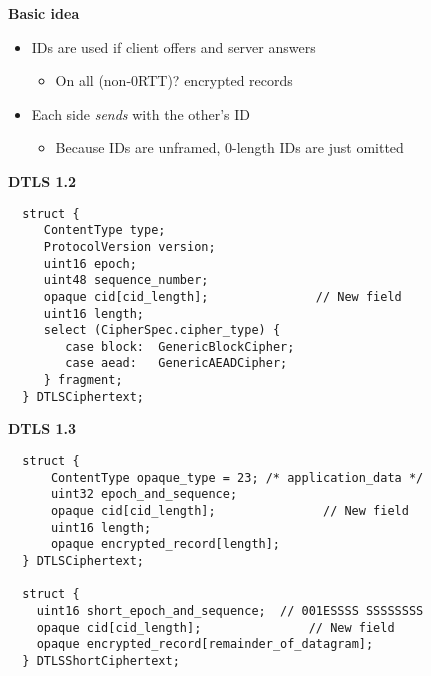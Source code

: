 \documentclass[helvetica]{seminar}
\newcommand{\heading}[1]{%
  \begin{center} 
    \large\bf 
    #1 
  \end{center} 
  \vspace{.4 in}}
\begin{document}
\begin{slide}
  \heading{Basic idea}
  
\begin{itemize}
\item IDs are used if client offers and server answers
  \begin{itemize}
    \item On all (non-0RTT)? encrypted records
  \end{itemize}
\item Each side \emph{sends} with the other's ID
  \begin{itemize}
    \item Because IDs are unframed, 0-length IDs are just omitted
  \end{itemize}
\end{itemize}
\end{slide}

\begin{slide}
  \heading{DTLS 1.2}

\begin{verbatim}
  struct {
     ContentType type;
     ProtocolVersion version;
     uint16 epoch;
     uint48 sequence_number;
     opaque cid[cid_length];               // New field
     uint16 length;
     select (CipherSpec.cipher_type) {
        case block:  GenericBlockCipher;
        case aead:   GenericAEADCipher;
     } fragment;
  } DTLSCiphertext;
\end{verbatim}
\end{slide}

\begin{slide}
  \heading{DTLS 1.3}

  \vspace{-5ex}
  \small{
\begin{verbatim}
  struct {
      ContentType opaque_type = 23; /* application_data */
      uint32 epoch_and_sequence;
      opaque cid[cid_length];               // New field
      uint16 length;
      opaque encrypted_record[length];
  } DTLSCiphertext;

  struct {
    uint16 short_epoch_and_sequence;  // 001ESSSS SSSSSSSS
    opaque cid[cid_length];               // New field
    opaque encrypted_record[remainder_of_datagram];
  } DTLSShortCiphertext;

\end{verbatim}
}
\end{slide}
\end{document}
